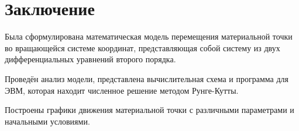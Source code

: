 \chapter{Заключение}
Была сформулирована математическая модель перемещения материальной точки во вращающейся системе координат, представляющая собой систему из двух дифференциальных уравнений второго порядка.

Проведён анализ модели, представлена вычислительная схема и программа для ЭВМ, которая находит численное решение методом Рунге-Кутты.

Построены графики движения материальной точки с различными параметрами и начальными условиями.
